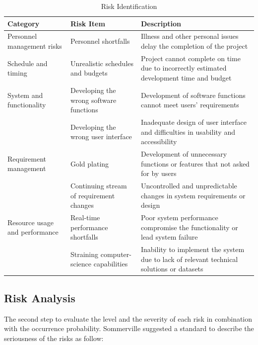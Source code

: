 \begin{table}[H]
\centering
\caption{Risk Identification}
\label{my-label}
\begin{tabular}{|p{3cm}|p{5cm}|p{5cm}|}
\hline
\textbf{Category}              & \textbf{Risk Item}                       & \textbf{Description}                                                                      \\ \hline
Personnel management risks     & Personnel shortfalls                     & Illness and other personal issues delay the completion of the project                     \\ \hline
Schedule and timing            & Unrealistic schedules and budgets        & Project cannot complete on time due to incorrectly estimated development time and budget  \\ \hline
System and functionality       & Developing the wrong software functions  & Development of software functions cannot meet users’ requirements                         \\ \cline{2-3} 
                               & Developing the wrong user interface      & Inadequate design of user interface and difficulties in usability and accessibility       \\ \hline
Requirement management         & Gold plating                             & Development of  unnecessary functions or features that not asked for by users             \\ \cline{2-3} 
                               & Continuing stream of requirement changes & Uncontrolled and unpredictable changes in system requirements or design                   \\ \hline
Resource usage and performance & Real-time performance shortfalls         & Poor system performance compromise the functionality or lead system failure               \\ \cline{2-3} 
                               & Straining computer-science capabilities  & Inability to implement the system due to lack of relevant technical solutions or datasets \\ \hline
\end{tabular}
\end{table}


\subsection{Risk Analysis}


The second step to evaluate the level and the severity of each risk in combination with the occurrence probability. Sommerville \cite{5_sommerville_2011} suggested a standard to describe the seriousness of the risks as follow:


